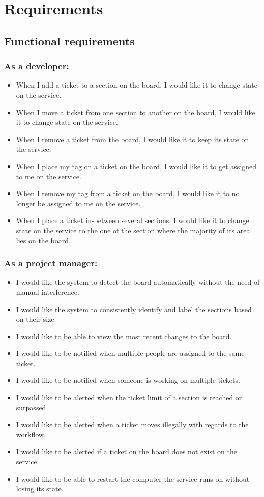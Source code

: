 \documentclass[12pt]{report}
\theoremstyle{definition}
\theoremstyle{remark}
\begin{document}
\section{Requirements}
\subsection{Functional requirements}
\subsubsection{As a developer:}
\begin{itemize}
    \item When I add a ticket to a section on the board, I would like it to change state on the service.
    \item When I move a ticket from one section to another on the board, I would like it to change state on the service.
    \item When I remove a ticket from the board, I would like it to keep its state on the service.
    \item When I place my tag on a ticket on the board, I would like it to get assigned to me on the service.
    \item When I remove my tag from a ticket on the board, I would like it to no longer be assigned to me on the service.
    \item When I place a ticket in-between several sections, I would like it to change state on the service to the one of the section where the majority of its area lies on the board.
\end{itemize}
\subsubsection{As a project manager:}
\begin{itemize}
    \item I would like the system to detect the board automatically without the need of manual interference.
    \item I would like the system to consistently identify and label the sections based on their size.
    \item I would like to be able to view the most recent changes to the board.
    \item I would like to be notified when multiple people are assigned to the same ticket.
    \item I would like to be notified when someone is working on multiple tickets.
    \item I would like to be alerted when the ticket limit of a section is reached or surpassed.
    \item I would like to be alerted when a ticket moves illegally with regards to the workflow.
    \item I would like to be alerted if a ticket on the board does not exist on the service.
    \item I would like to be able to restart the computer the service runs on without losing its state.
\end{itemize}
\end{document}
